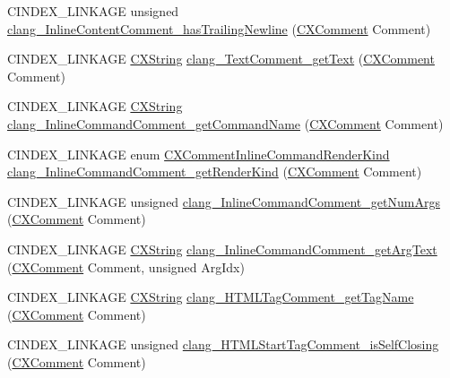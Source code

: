 \begin{DoxyCompactItemize}
C\+I\+N\+D\+E\+X\+\_\+\+L\+I\+N\+K\+A\+GE unsigned \mbox{\hyperlink{group__CINDEX__COMMENT_gacbc2924271ca86226c024e859e0a75c8}{clang\+\_\+\+Inline\+Content\+Comment\+\_\+has\+Trailing\+Newline}} (\mbox{\hyperlink{structCXComment}{C\+X\+Comment}} Comment)
\item 
C\+I\+N\+D\+E\+X\+\_\+\+L\+I\+N\+K\+A\+GE \mbox{\hyperlink{structCXString}{C\+X\+String}} \mbox{\hyperlink{group__CINDEX__COMMENT_gae9a27e851356181beac36bbff6e638e2}{clang\+\_\+\+Text\+Comment\+\_\+get\+Text}} (\mbox{\hyperlink{structCXComment}{C\+X\+Comment}} Comment)
\item 
C\+I\+N\+D\+E\+X\+\_\+\+L\+I\+N\+K\+A\+GE \mbox{\hyperlink{structCXString}{C\+X\+String}} \mbox{\hyperlink{group__CINDEX__COMMENT_ga77f5b160e7d73190ac518298c1e79d05}{clang\+\_\+\+Inline\+Command\+Comment\+\_\+get\+Command\+Name}} (\mbox{\hyperlink{structCXComment}{C\+X\+Comment}} Comment)
\item 
C\+I\+N\+D\+E\+X\+\_\+\+L\+I\+N\+K\+A\+GE enum \mbox{\hyperlink{group__CINDEX__COMMENT_ga23efacd9c1e4e286a9f9714e1720fdcf}{C\+X\+Comment\+Inline\+Command\+Render\+Kind}} \mbox{\hyperlink{group__CINDEX__COMMENT_ga3dd54ce1288d09c408cac8c887da2ebd}{clang\+\_\+\+Inline\+Command\+Comment\+\_\+get\+Render\+Kind}} (\mbox{\hyperlink{structCXComment}{C\+X\+Comment}} Comment)
\item 
C\+I\+N\+D\+E\+X\+\_\+\+L\+I\+N\+K\+A\+GE unsigned \mbox{\hyperlink{group__CINDEX__COMMENT_ga78db1049239be9649c2829cdeb83c544}{clang\+\_\+\+Inline\+Command\+Comment\+\_\+get\+Num\+Args}} (\mbox{\hyperlink{structCXComment}{C\+X\+Comment}} Comment)
\item 
C\+I\+N\+D\+E\+X\+\_\+\+L\+I\+N\+K\+A\+GE \mbox{\hyperlink{structCXString}{C\+X\+String}} \mbox{\hyperlink{group__CINDEX__COMMENT_ga6824f3cdcb42edbd143db77a657fe888}{clang\+\_\+\+Inline\+Command\+Comment\+\_\+get\+Arg\+Text}} (\mbox{\hyperlink{structCXComment}{C\+X\+Comment}} Comment, unsigned Arg\+Idx)
\item 
C\+I\+N\+D\+E\+X\+\_\+\+L\+I\+N\+K\+A\+GE \mbox{\hyperlink{structCXString}{C\+X\+String}} \mbox{\hyperlink{group__CINDEX__COMMENT_ga55b84483c67c0629260b1534d4b3f80e}{clang\+\_\+\+H\+T\+M\+L\+Tag\+Comment\+\_\+get\+Tag\+Name}} (\mbox{\hyperlink{structCXComment}{C\+X\+Comment}} Comment)
\item 
C\+I\+N\+D\+E\+X\+\_\+\+L\+I\+N\+K\+A\+GE unsigned \mbox{\hyperlink{group__CINDEX__COMMENT_ga052be5f208a0ef2f76e3e9923a96ef19}{clang\+\_\+\+H\+T\+M\+L\+Start\+Tag\+Comment\+\_\+is\+Self\+Closing}} (\mbox{\hyperlink{structCXComment}{C\+X\+Comment}} Comment)

\end{DoxyCompactItemize}
